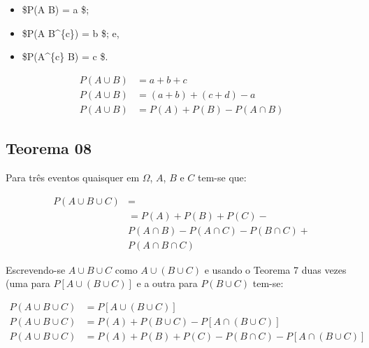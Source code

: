 \documentclass[
]{book}
\providecommand{\tightlist}{%
  \setlength{\itemsep}{0pt}\setlength{\parskip}{0pt}}
\begin{document}
\hfill\break

\begin{itemize}
\tightlist
\item
  \$P(A \cap B) = a \$;\\
\item
  \$P(A \cap B\^{}\{c\}) = b \$; e,\\
\item
  \$P(A\^{}\{c\} \cap B) = c \$.
\end{itemize}

\hfill\break

\begin{align*}
P ( A \cup B) & = a + b + c \\
P ( A \cup B) & = (a + b) + (c + d) - a \\
P ( A \cup B) & = P(A) + P(B) - P(A \cap B)
\end{align*}

\hfill\break

\hypertarget{teorema-08}{%
\subsection{Teorema 08}\label{teorema-08}}

\hfill\break

Para três eventos quaisquer em \(\Omega\), \(A\), \(B\) e \(C\) tem-se que:

\hfill\break

\begin{align*}
P( A \cup B \cup C ) & = \\
                     & = P(A) + P(B) +P(C) - \\
                     & P(A \cap B) - P(A \cap C) - P(B \cap C)  + \\
                     & P(A \cap B \cap C)
\end{align*}

\hfill\break

Escrevendo-se \(A \cup B \cup C\) como \(A \cup (B \cup C)\) e usando o Teorema 7 duas vezes (uma para \(P[A \cup (B \cup C)]\) e a outra para \(P( B \cup C)\) tem-se:

\hfill\break

\begin{align*}
P( A \cup B \cup C) &  = P[ A \cup (B \cup C)] \\
P( A \cup B \cup C) & = P(A) + P( B \cup C) - P [A \cap (B \cup C)]\\
P( A \cup B \cup C) & = P(A) + P(B) + P(C) - P (B \cap C) - P [A \cap (B \cup C)]
\end{align*}
\end{document}
